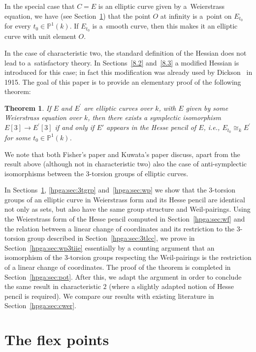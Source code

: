 \documentclass[11pt]{article}
\newcommand{\mpp}{{\mathbb{P}}}
\newcommand{\msetp}[1]{{\left({#1}\right)}}					%
\newcommand{\msets}[1]{{\left[{#1}\right]}}					%
\newcommand{\mps}[2]{{\mpp^{#1}\msetp{#2}}}						%
\numberwithin{equation}{section}
\newtheorem{Theorem}{Theorem}[section]
\begin{document}
In the special case that $C=E$ is an elliptic curve given by a~Weierstrass equation, we have (see Section~\ref{hpga:sec:fp}) that the point $O$ at infinity is a~point on $E_{t_0}$ for every $t_0\in\mps{1}{k}$. If $E_{t_0}$ is a~smooth curve, then this makes it an elliptic curve with unit element $O$.

In the case of characteristic two, the standard definition of the Hessian does not lead to a~satisfactory theory. In Sections~\ref{8.2} and~\ref{8.3} a modified Hessian is introduced for this case; in fact this modification was already used by Dickson~\cite{Dickson} in 1915. The goal of this paper is to provide an elementary proof of the following theorem:

\begin{Theorem}\label{hpga:thm:mt} If $E$ and $E^\prime$ are elliptic curves over $k$, with $E$ given by some Weierstrass equation over $k$, then there exists a symplectic isomorphism $E\msets{3}\rightarrow E^\prime\msets{3}$ if and only if $E'$ appears in the Hesse pencil of $E$, i.e., $E_{t_0}\cong_kE^\prime$ for some $t_0\in\mps{1}{k}$.
\end{Theorem}

We note that both Fisher's paper \cite{fisher2012} and Kuwata's paper \cite{kuwata2012} discuss, apart from the result above (although not in characteristic two) also the case of anti-symplectic isomorphisms between the $3$-torsion groups of elliptic curves.

In Sections~\ref{hpga:sec:fp}, \ref{hpga:sec:3tgrp} and~\ref{hpga:sec:wp} we show that the 3-torsion groups of an elliptic curve in Weierstrass form and its Hesse pencil are identical not only as sets, but also have the same group structure and Weil-pairings. Using the Weierstrass form of the Hesse pencil computed in Section~\ref{hpga:sec:wf} and the relation between a linear change of coordinates and its restriction to the 3-torsion group described in Section~\ref{hpga:sec:3tlcc}, we prove in Section~\ref{hpga:sec:wp3tiie} essentially by a counting argument that an
isomorphism of the 3-torsion groups respecting the Weil-pairings is the restriction of a linear change of coordinates. The proof of the theorem is completed in Section~\ref{hpga:sec:pot}. After this, we adapt the argument in order to conclude the same result in characteristic $2$ (where a slightly adapted notion of Hesse pencil is required). We compare our results with existing literature in Section~\ref{hpga:sec:cwer}.

\section{The flex points}\label{hpga:sec:fp}
\end{document}
